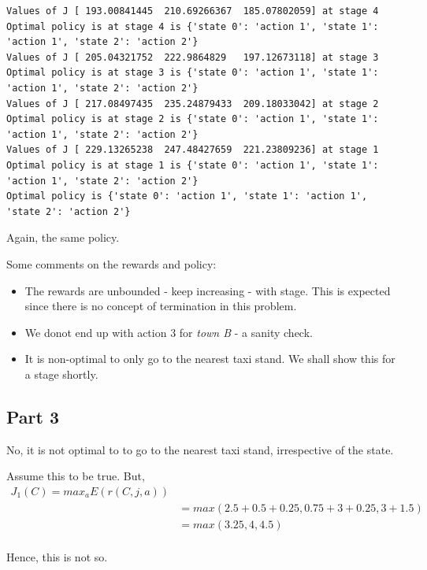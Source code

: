 \begin{lstlisting}[numbers = none]
Values of J [ 193.00841445  210.69266367  185.07802059] at stage 4
Optimal policy is at stage 4 is {'state 0': 'action 1', 'state 1': 'action 1', 'state 2': 'action 2'}
Values of J [ 205.04321752  222.9864829   197.12673118] at stage 3
Optimal policy is at stage 3 is {'state 0': 'action 1', 'state 1': 'action 1', 'state 2': 'action 2'}
Values of J [ 217.08497435  235.24879433  209.18033042] at stage 2
Optimal policy is at stage 2 is {'state 0': 'action 1', 'state 1': 'action 1', 'state 2': 'action 2'}
Values of J [ 229.13265238  247.48427659  221.23809236] at stage 1
Optimal policy is at stage 1 is {'state 0': 'action 1', 'state 1': 'action 1', 'state 2': 'action 2'}
Optimal policy is {'state 0': 'action 1', 'state 1': 'action 1', 'state 2': 'action 2'}
\end{lstlisting}

Again, the same policy.

Some comments on the rewards and policy:
\begin{itemize}
\item The rewards are unbounded - keep increasing - with stage. This is expected since there is no concept of termination in this problem.
\item We donot end up with action 3 for \textit{town B} - a sanity check.
\item It is non-optimal to only go to the nearest taxi stand. We shall show this for a stage shortly.
\end{itemize}

\subsection{Part 3}

No, it is not optimal to  to go to the nearest taxi stand, irrespective of the state.

\begin{Proof}
Assume this to be true. But, \\

\begin{align*}
J_1(C)=max_a E(r(C,j,a)) \\
& = max ( 2.5+0.5+0.25, 0.75+ 3 + 0.25, 3+ 1.5)\\
& = max( 3.25, 4, 4.5) 
\end{align*}
\\
Hence, this is not so.
\end{Proof}


